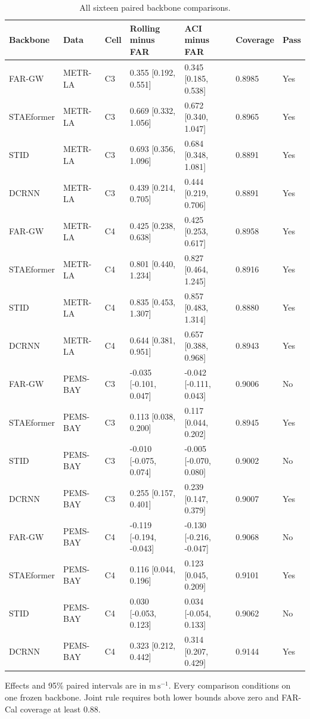 \documentclass[pdflatex,sn-mathphys-num]{sn-jnl}
\newcommand{\ms}{\mathrm{m\,s^{-1}}}
\begin{document}
\begin{table}[!htbp]
\caption{All sixteen paired backbone comparisons.}\label{tab:backbones}
\centering\setlength{\tabcolsep}{3pt}\footnotesize
\setlength{\tabcolsep}{4pt}
\begin{tabular}{lllllll}\toprule
Backbone & Data & Cell & Rolling minus FAR & ACI minus FAR & Coverage & Pass \\\midrule
FAR-GW & METR-LA & C3 & 0.355 [0.192, 0.551] & 0.345 [0.185, 0.538] & 0.8985 & Yes \\
STAEformer & METR-LA & C3 & 0.669 [0.332, 1.056] & 0.672 [0.340, 1.047] & 0.8965 & Yes \\
STID & METR-LA & C3 & 0.693 [0.356, 1.096] & 0.684 [0.348, 1.081] & 0.8891 & Yes \\
DCRNN & METR-LA & C3 & 0.439 [0.214, 0.705] & 0.444 [0.219, 0.706] & 0.8891 & Yes \\
FAR-GW & METR-LA & C4 & 0.425 [0.238, 0.638] & 0.425 [0.253, 0.617] & 0.8958 & Yes \\
STAEformer & METR-LA & C4 & 0.801 [0.440, 1.234] & 0.827 [0.464, 1.245] & 0.8916 & Yes \\
STID & METR-LA & C4 & 0.835 [0.453, 1.307] & 0.857 [0.483, 1.314] & 0.8880 & Yes \\
DCRNN & METR-LA & C4 & 0.644 [0.381, 0.951] & 0.657 [0.388, 0.968] & 0.8943 & Yes \\
FAR-GW & PEMS-BAY & C3 & -0.035 [-0.101, 0.047] & -0.042 [-0.111, 0.043] & 0.9006 & No \\
STAEformer & PEMS-BAY & C3 & 0.113 [0.038, 0.200] & 0.117 [0.044, 0.202] & 0.8945 & Yes \\
STID & PEMS-BAY & C3 & -0.010 [-0.075, 0.074] & -0.005 [-0.070, 0.080] & 0.9002 & No \\
DCRNN & PEMS-BAY & C3 & 0.255 [0.157, 0.401] & 0.239 [0.147, 0.379] & 0.9007 & Yes \\
FAR-GW & PEMS-BAY & C4 & -0.119 [-0.194, -0.043] & -0.130 [-0.216, -0.047] & 0.9068 & No \\
STAEformer & PEMS-BAY & C4 & 0.116 [0.044, 0.196] & 0.123 [0.045, 0.209] & 0.9101 & Yes \\
STID & PEMS-BAY & C4 & 0.030 [-0.053, 0.123] & 0.034 [-0.054, 0.133] & 0.9062 & No \\
DCRNN & PEMS-BAY & C4 & 0.323 [0.212, 0.442] & 0.314 [0.207, 0.429] & 0.9144 & Yes \\
\bottomrule\end{tabular}
\par\smallskip\footnotesize Effects and 95\% paired intervals are in $\ms$. Every comparison conditions on one frozen backbone. Joint rule requires both lower bounds above zero and FAR-Cal coverage at least 0.88.
\end{table}
\FloatBarrier
\end{document}
